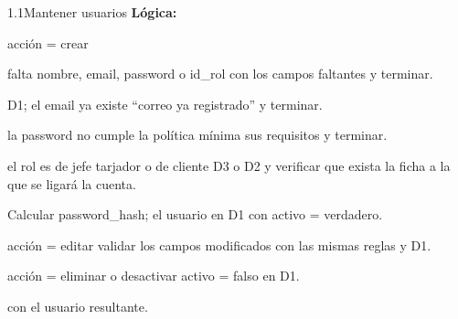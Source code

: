 \begin{minispec}{1.1}{Mantener usuarios}
\textbf{Lógica:}
\begin{logica}
    \item {} acción = crear 
    \begin{logica}
        \item {} falta nombre, email, password o id\_rol 
         con los campos faltantes y terminar.
        \item {} D1;  el email ya existe  ``correo ya
        registrado'' y terminar.
        \item {} la password no cumple la política mínima  sus
        requisitos y terminar.
        \item {} el rol es de jefe tarjador o de cliente  D3 o D2 y
        verificar que exista la ficha a la que se ligará la cuenta.
        \item Calcular password\_hash;  el usuario en D1 con activo = verdadero.
    \end{logica}
    \item {} acción = editar  validar los campos modificados con las mismas
    reglas y  D1.
    \item {} acción = eliminar o desactivar  activo = falso en D1.
    \item {}  con el usuario resultante.
\end{logica}
\end{minispec}

